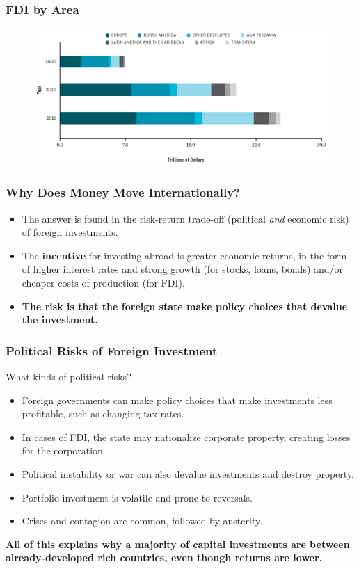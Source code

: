 \documentclass{beamer}
\begin{document}
\begin{frame} 
\frametitle{\LARGE{FDI by Area}}
\begin{figure}[ht!]
\centering
\includegraphics[width=\textwidth,height=0.8\textheight,keepaspectratio]{./fdiarea.png}
\end{figure}
\end{frame}

\begin{frame} 
	\frametitle{\LARGE{Why Does Money Move Internationally?}}
		\large{
			\begin{itemize}
			    \item The answer is found in the risk-return trade-off (political \textit{and} economic risk) of foreign investments. \pause 
			    \item The \textbf{incentive} for investing abroad is greater economic returns, in the form of higher interest rates and strong growth (for stocks, loans, bonds) and/or cheaper costs of production (for FDI). 
			    \item \textbf{The risk is that the foreign state make policy choices that devalue the investment.}
			\end{itemize}
		}
\end{frame}


\begin{frame} 
	\frametitle{\LARGE{Political Risks of Foreign Investment}}
	What kinds of political risks?
	\begin{itemize}
		\item Foreign governments can make policy choices that make investments less profitable, such as changing tax rates. \pause 
		\item In cases of FDI, the state may nationalize corporate property, creating losses for the corporation. \pause
		\item Political instability or war can also devalue investments and destroy property.
		\item Portfolio investment is volatile and prone to reversals. \pause 
		\item Crises and contagion are common, followed by austerity. \pause 
	\end{itemize}
	\textbf{All of this explains why a majority of capital investments are between already-developed rich countries, even though returns are lower.}
\end{frame}
\end{document}

